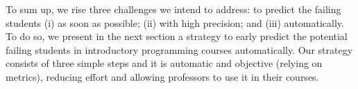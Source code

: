 To sum up, we rise three challenges we intend to address: to predict the failing students (i) as soon as possible; (ii) with high precision; and (iii) automatically. To do so, we present in the next section a strategy to early predict the potential failing students in introductory programming courses automatically. Our strategy consists of three simple steps and it is automatic and objective (relying on metrics), reducing effort and allowing professors to use it in their courses.








